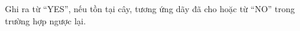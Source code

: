 Ghi ra từ “YES”, nếu tồn tại cây, tương ứng dãy đã cho hoặc từ “NO” trong trường hợp ngược lại.